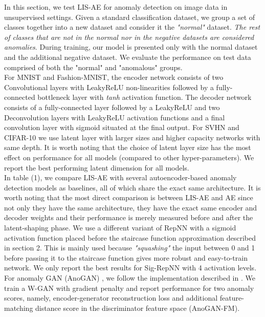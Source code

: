 \documentclass[acmtog, nonacm]{acmart}
\begin{document}
In this section, we test LIS-AE for anomaly detection on image data in unsupervised settings. Given a standard classification dataset, we group a set of classes together into a new dataset and consider it the \textit{"normal"} dataset. \textit{The rest of classes that are not in the normal nor in the negative datasets are considered anomalies}. During training, our model is presented only with the normal dataset and the additional negative dataset. We evaluate the performance on test data comprised of both the "normal" and "anomalous" groups.\\ For MNIST and Fashion-MNIST, the encoder network consists of two Convolutional layers with LeakyReLU non-linearities followed by a fully-connected bottleneck layer with \textit{tanh} activation function. The decoder network consists of a fully-connected layer followed by a LeakyReLU and two Deconvolution layers with LeakyReLU activation functions and a final convolution layer with sigmoid situated at the final output. For SVHN and CIFAR-10 we use latent layer with larger sizes and higher capacity networks with same depth. It is worth noting that the choice of latent layer size has the most effect on performance for all models (compared to other hyper-parameters). We report the best performing latent dimension for all models.
\\
In table (1), we compare LIS-AE with several autoencoder-based anomaly detection models as baselines, all of which share the exact same architecture. It is worth noting that the most direct comparison is between LIS-AE and AE since not only they have the same architecture, they have the exact same encoder and decoder weights and their performance is merely measured before and after the latent-shaping phase. We use a different variant of RepNN with a sigmoid activation function  placed before the  staircase function approximation described in section 2. This is mainly used because \textit{"squashing"} the input between 0 and 1 before passing it to the staircase function gives more robust and easy-to-train network. We only report the best results for Sig-RepNN with 4 activation levels. For anomaly GAN (AnoGAN) \cite{schlegl2017unsupervised}, we follow the implementation described in \cite{schlegl2019f}. We train a W-GAN \cite{gulrajani2017improved} with gradient penalty and report performance for two anomaly scores, namely, encoder-generator reconstruction loss and additional feature-matching distance score in the discriminator feature space (AnoGAN-FM). 
\end{document}
